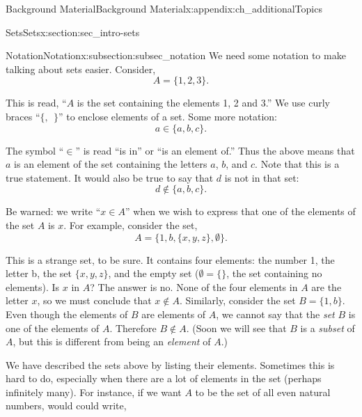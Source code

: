 \documentclass[oneside,10pt,]{book}
\numberwithin{equation}{chapter}
\begin{document}
\begin{appendixptx}{Background Material}{}{Background Material}{}{}{x:appendix:ch_additionalTopics}
\begin{sectionptx}{Sets}{}{Sets}{}{}{x:section:sec_intro-sets}
\begin{introduction}{}
\end{introduction}%
%
%
\typeout{************************************************}
\typeout{************************************************}
%
\begin{subsectionptx}{Notation}{}{Notation}{}{}{x:subsection:subsec_notation}
We need some notation to make talking about sets easier. Consider,%
\begin{equation*}
A = \{1, 2, 3\}.
\end{equation*}
%
\par
This is read, ``\(A\) is the set containing the elements 1, 2 and 3.'' We use curly braces ``\(\{,~~ \}\)'' to enclose elements of a set. Some more notation:%
\begin{equation*}
a \in \{a, b, c\}.
\end{equation*}
%
\par
The symbol ``\(\in\)'' is read ``is in'' or ``is an element of.'' Thus the above means that \(a\) is an element of the set containing the letters \(a\), \(b\), and \(c\). Note that this is a true statement. It would also be true to say that \(d\) is not in that set:%
\begin{equation*}
d \not\in \{a, b, c\}.
\end{equation*}
%
\par
Be warned: we write ``\(x \in A\)'' when we wish to express that one of the elements of the set \(A\) is \(x\). For example, consider the set,%
\begin{equation*}
A = \{1, b, \{x, y, z\}, \emptyset\}.
\end{equation*}
%
\par
This is a strange set, to be sure. It contains four elements: the number 1, the letter b, the set \(\{x,y,z\}\), and the empty set (\(\emptyset = \{ \}\), the set containing no elements). Is \(x\) in \(A\)? The answer is no. None of the four elements in \(A\) are the letter \(x\), so we must conclude that \(x \notin A\). Similarly, consider the set \(B = \{1,b\}\). Even though the elements of \(B\) are elements of \(A\), we cannot say that the \emph{set} \(B\) is one of the elements of \(A\). Therefore \(B \notin A\). (Soon we will see that \(B\) is a \emph{subset} of \(A\), but this is different from being an \emph{element} of \(A\).)%
\par
We have described the sets above by listing their elements. Sometimes this is hard to do, especially when there are a lot of elements in the set (perhaps infinitely many). For instance, if we want \(A\) to be the set of all even natural numbers, would could write,%

\end{subsectionptx}
\end{sectionptx}
\end{appendixptx}
\end{document}
